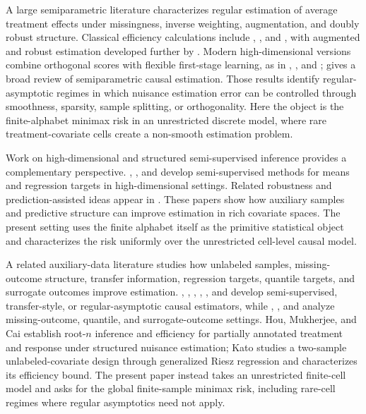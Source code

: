 \documentclass[11pt]{article}
\begin{document}
A large semiparametric literature characterizes regular estimation of average treatment effects under missingness, inverse weighting, augmentation, and doubly robust structure. Classical efficiency calculations include \citet{RobinsRotnitzkyZhao1994}, \citet{Hahn1998}, and \citet{HiranoImbensRidder2003}, with augmented and robust estimation developed further by \citet{BangRobins2005}. Modern high-dimensional versions combine orthogonal scores with flexible first-stage learning, as in \citet{Farrell2015}, \citet{AtheyImbensWager2018}, and \citet{ChernozhukovChetverikovDemirerDufloHansenNeweyRobins2018}; \citet{Kennedy2016} gives a broad review of semiparametric causal estimation. Those results identify regular-asymptotic regimes in which nuisance estimation error can be controlled through smoothness, sparsity, sample splitting, or orthogonality. Here the object is the finite-alphabet minimax risk in an unrestricted discrete model, where rare treatment-covariate cells create a non-smooth estimation problem.

Work on high-dimensional and structured semi-supervised inference provides a complementary perspective. \citet{ZhangBrownCai2019}, \citet{ChakraborttyCai2018}, and \citet{DengNingZhaoZhang2024} develop semi-supervised methods for means and regression targets in high-dimensional settings. Related robustness and prediction-assisted ideas appear in \citet{AngelopoulosBatesFannjiangJordanZrnic2023}. These papers show how auxiliary samples and predictive structure can improve estimation in rich covariate spaces. The present setting uses the finite alphabet itself as the primitive statistical object and characterizes the risk uniformly over the unrestricted cell-level causal model.

A related auxiliary-data literature studies how unlabeled samples, missing-outcome structure, transfer information, regression targets, quantile targets, and surrogate outcomes improve estimation. \citet{ChengAnanthakrishnanCai2021}, \citet[Sections 2--4]{HouMukherjeeCai2025}, \citet[Sections 3--5]{Kato2025}, \citet{ChakraborttyDai2024}, \citet{AnniwaerZhang2025}, and \citet{XuWittenShojaie2025} develop semi-supervised, transfer-style, or regular-asymptotic causal estimators, while \citet{ChakraborttyLuCaiLi2019}, \citet{ChakraborttyDaiCarroll2022}, and \citet{KallusMao2025} analyze missing-outcome, quantile, and surrogate-outcome settings. Hou, Mukherjee, and Cai establish root-\(n\) inference and efficiency for partially annotated treatment and response under structured nuisance estimation; Kato studies a two-sample unlabeled-covariate design through generalized Riesz regression and characterizes its efficiency bound. The present paper instead takes an unrestricted finite-cell model and asks for the global finite-sample minimax risk, including rare-cell regimes where regular asymptotics need not apply.
\end{document}

